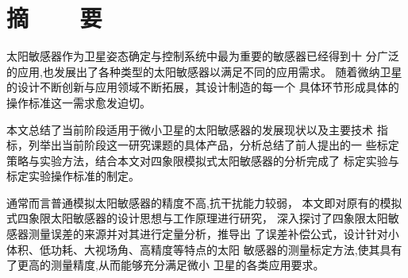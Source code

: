 ﻿
\renewcommand{\baselinestretch}{1.5}
\fontsize{12pt}{13pt}\selectfont

\chapter*{摘~~~~要}

\vspace{1em}

太阳敏感器作为卫星姿态确定与控制系统中最为重要的敏感器已经得到十
分广泛的应用,也发展出了各种类型的太阳敏感器以满足不同的应用需求。
随着微纳卫星的设计不断创新与应用领域不断拓展，其设计制造的每一个
具体环节形成具体的操作标准这一需求愈发迫切。

本文总结了当前阶段适用于微小卫星的太阳敏感器的发展现状以及主要技术
指标，列举出当前阶段这一研究课题的具体产品，分析总结了前人提出的一
些标定策略与实验方法，结合本文对四象限模拟式太阳敏感器的分析完成了
标定实验与标定实验操作标准的制定。

通常而言普通模拟太阳敏感器的精度不高,抗干扰能力较弱，
本文即对原有的模拟式四象限太阳敏感器的设计思想与工作原理进行研究，
深入探讨了四象限太阳敏感器测量误差的来源并对其进行定量分析，推导出
了误差补偿公式，设计针对小体积、低功耗、大视场角、高精度等特点的太阳
敏感器的测量标定方法,使其具有了更高的测量精度,从而能够充分满足微小
卫星的各类应用要求。

\vspace{0.1in}
